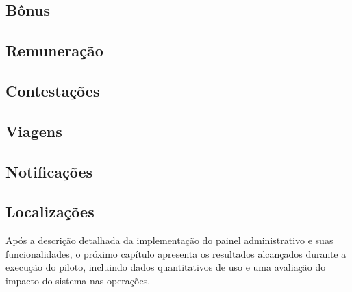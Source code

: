 \subsection{Bônus}
\label{sec:bonus}



\subsection{Remuneração}
\label{sec:remuneracao}



\subsection{Contestações}
\label{sec:contestacoes}



\subsection{Viagens}
\label{sec:viagens}


\subsection{Notificações}
\label{sec:notificacoes}


\subsection{Localizações}
\label{sec:localizacoes}


Após a descrição detalhada da implementação do painel administrativo e suas funcionalidades, o próximo capítulo apresenta os resultados alcançados durante a execução do piloto, incluindo dados quantitativos de uso e uma avaliação do impacto do sistema nas operações.

